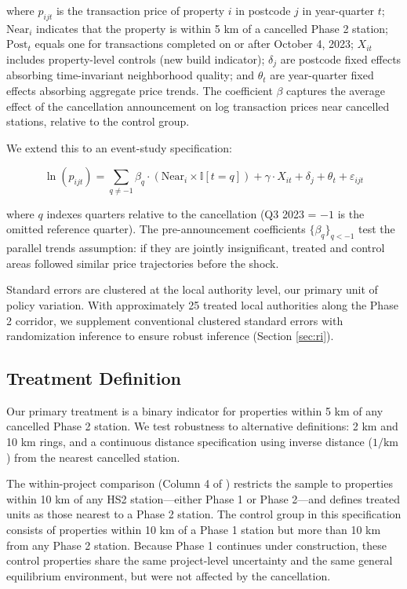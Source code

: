 \documentclass[12pt]{article}
\newcommand{\ind}{\mathbb{I}}
\begin{document}
\noindent where $p_{ijt}$ is the transaction price of property $i$ in postcode $j$ in year-quarter $t$; $\text{Near}_{i}$ indicates that the property is within 5 km of a cancelled Phase 2 station; $\text{Post}_{t}$ equals one for transactions completed on or after October 4, 2023; $X_{it}$ includes property-level controls (new build indicator); $\delta_j$ are postcode fixed effects absorbing time-invariant neighborhood quality; and $\theta_t$ are year-quarter fixed effects absorbing aggregate price trends. The coefficient $\beta$ captures the average effect of the cancellation announcement on log transaction prices near cancelled stations, relative to the control group.

We extend this to an event-study specification:

\begin{equation}
\ln(p_{ijt}) = \sum_{q \neq -1} \beta_q \cdot (\text{Near}_{i} \times \ind[t = q]) + \gamma \cdot X_{it} + \delta_j + \theta_t + \varepsilon_{ijt}
\label{eq:eventstudy}
\end{equation}

\noindent where $q$ indexes quarters relative to the cancellation (Q3 2023 = $-1$ is the omitted reference quarter). The pre-announcement coefficients $\{\beta_q\}_{q < -1}$ test the parallel trends assumption: if they are jointly insignificant, treated and control areas followed similar price trajectories before the shock.

Standard errors are clustered at the local authority level, our primary unit of policy variation. With approximately 25 treated local authorities along the Phase 2 corridor, we supplement conventional clustered standard errors with randomization inference to ensure robust inference (Section \ref{sec:ri}).

\subsection{Treatment Definition}

Our primary treatment is a binary indicator for properties within 5 km of any cancelled Phase 2 station. We test robustness to alternative definitions: 2 km and 10 km rings, and a continuous distance specification using inverse distance ($1/\text{km}$) from the nearest cancelled station.

The within-project comparison (Column 4 of ) restricts the sample to properties within 10 km of any HS2 station---either Phase 1 or Phase 2---and defines treated units as those nearest to a Phase 2 station. The control group in this specification consists of properties within 10 km of a Phase 1 station but more than 10 km from any Phase 2 station. Because Phase 1 continues under construction, these control properties share the same project-level uncertainty and the same general equilibrium environment, but were not affected by the cancellation.
\end{document}
